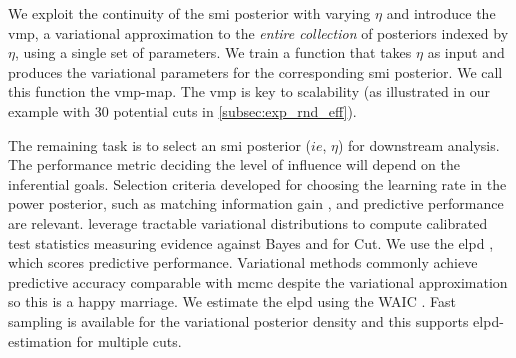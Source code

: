We exploit the continuity of the \acrshort*{smi} posterior with varying $\eta$ and introduce the \acrfull*{vmp}, a variational approximation to the \emph{entire collection} of posteriors indexed by $\eta$, using a single set of parameters.
We train a function that takes $\eta$ as input and produces the variational parameters for the corresponding \acrshort*{smi} posterior.
We call this function the \acrshort*{vmp}-map.
The \acrlong*{vmp} is key to scalability (as illustrated in our example with 30 potential cuts in \cref{subsec:exp_rnd_eff}).

The remaining task is to select an \acrshort*{smi} posterior ($ie$, $\eta$) for downstream analysis.
The performance metric deciding the level of influence will depend on the inferential goals.
Selection criteria \citep{wu-martin-20} developed for choosing the learning rate in the power posterior, such as matching information gain \citep{holmes-walker-17}, and predictive performance \citep{Vehtari2016,Jacob2017together,wu-martin-21} are relevant.
\cite{Yu2021variationalcut} leverage tractable variational distributions to compute calibrated test statistics \citep{nott21-prior-check} measuring evidence against Bayes and for Cut.
We use the \acrfull*{elpd} \citep{Vehtari2016}, which scores predictive performance.
Variational methods commonly achieve predictive accuracy comparable with \acrshort*{mcmc} despite the variational approximation \citep{Wang2019VariationalMisspecification} so this is a happy marriage.
We estimate the \acrshort*{elpd} using the WAIC \citep{Watanabe2012}. Fast sampling is available for the variational posterior density and this supports \acrshort*{elpd}-estimation for multiple cuts.


